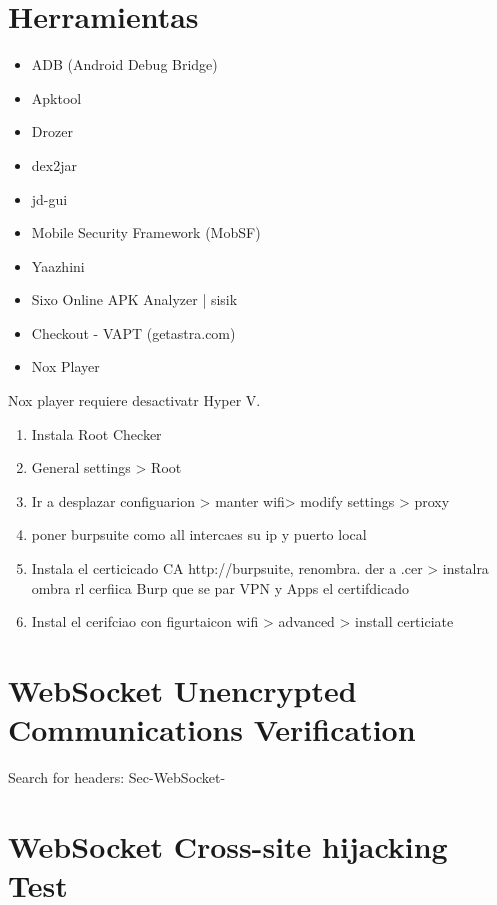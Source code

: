 

\section{Herramientas}

\begin{itemize}
\item ADB (Android Debug Bridge)
\item Apktool
 \item Drozer
 \item dex2jar
 \item jd-gui
 \item Mobile Security Framework (MobSF)
 \item Yaazhini
 \item Sixo Online APK Analyzer | sisik
 \item Checkout - VAPT (getastra.com)
 \item Nox Player
\end{itemize}

Nox player requiere desactivatr Hyper V. 

\begin{enumerate}
	\item Instala Root Checker
 \item General settings > Root
 \item Ir a desplazar configuarion > manter wifi> modify settings > proxy
 \item poner burpsuite como all intercaes su ip y puerto local
 \item Instala el certicicado CA http://burpsuite, renombra. der a .cer > instalra ombra rl cerfiica Burp que se par VPN y Apps el certifdicado
 \item Instal el cerifciao con figurtaicon wifi > advanced > install certiciate
\end{enumerate}


\section{WebSocket Unencrypted Communications Verification}

Search for headers: Sec-WebSocket-

\section{WebSocket Cross-site hijacking Test}

